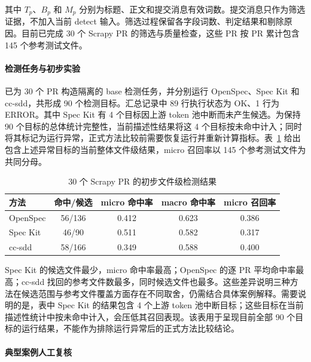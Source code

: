 其中 $T_p$、$B_p$ 和 $M_p$ 分别为标题、正文和提交消息有效词数。提交消息只作为筛选证据，不加入当前 detect 输入。筛选过程保留各字段词数、判定结果和剔除原因。目前已完成 30 个 Scrapy PR 的筛选与质量检查，这些 PR 按 PR 累计包含 145 个参考测试文件。

\paragraph{检测任务与初步实验}

已为 30 个 PR 构造隔离的 base 检测任务，并分别运行 OpenSpec、Spec Kit 和 cc-sdd，共形成 90 个检测目标。汇总记录中 89 行执行状态为 OK、1 行为 ERROR。其中 Spec Kit 有 4 个目标因上游 token 池中断而未产生候选。为保持 90 个目标的总体统计完整性，当前描述性结果将这 4 个目标按未命中计入；同时将其标记为运行异常，正式方法比较前需要恢复运行并重新计算指标。表~\ref{tab:pilot-detect-results} 给出包含上述异常目标的当前整体文件级结果，micro 召回率以 145 个参考测试文件为共同分母。

\begin{table}[htbp]
  \centering
  \caption{30 个 Scrapy PR 的初步文件级检测结果}
  \label{tab:pilot-detect-results}
  \small
  \begin{tabular}{lcccc}
    \hline
    方法 & 命中/候选 & micro 命中率 & macro 命中率 & micro 召回率 \\
    \hline
    OpenSpec & 56/136 & 0.412 & 0.623 & 0.386 \\
    Spec Kit & 46/90 & 0.511 & 0.582 & 0.317 \\
    cc-sdd & 58/166 & 0.349 & 0.588 & 0.400 \\
    \hline
  \end{tabular}
\end{table}

Spec Kit 的候选文件最少，micro 命中率最高；OpenSpec 的逐 PR 平均命中率最高；cc-sdd 找回的参考文件数最多，同时候选文件也最多。这些差异说明三种方法在候选范围与参考文件覆盖方面存在不同取舍，仍需结合具体案例解释。需要说明的是，表中 Spec Kit 的结果包含 4 个上游 token 池中断目标；这些目标在当前描述性统计中按未命中计入，会压低其召回表现。该表用于呈现目前全部 90 个目标的运行结果，不能作为排除运行异常后的正式方法比较结论。

\paragraph{典型案例人工复核}

